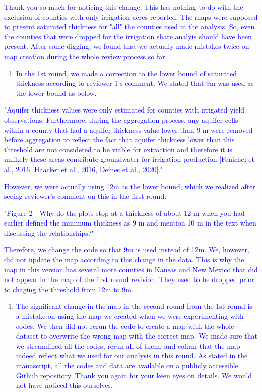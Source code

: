 \documentclass[
]{article}
\providecommand{\tightlist}{%
  \setlength{\itemsep}{0pt}\setlength{\parskip}{0pt}}
\begin{document}
\textcolor{blue}{Thank you so much for noticing this change. This has nothing to do with the exclusion of counties with only irrigation acres reported. The maps were supposed to present saturated thickness for "all" the counties used in the analysis. So, even the counties that were dropped for the irrigation share analyis should have been present. After some digging, we found that we actually made mistakes twice on map creation during the whole review process so far.}

\begin{enumerate}
\def\labelenumi{\arabic{enumi}.}
\tightlist
\item
  \textcolor{blue}{In the 1st round, we made a correction to the lower bound of saturated thickness according to reviewer 1's comment. We stated that 9m was used as the lower bound as below.}
\end{enumerate}

\textcolor{blue}{"Aquifer thickness values were only estimated for counties with irrigated yield observations. Furthermore, during the aggregation process, any aquifer cells within a county that had a aquifer thickness value lower than 9 m were removed before aggregation to reflect the fact that aquifer thickness lower than this threshold are not considered to be viable for extraction and therefore it is unlikely these areas contribute groundwater for irrigation production [Fenichel et al., 2016, Haacker et al., 2016, Deines et al., 2020]."}

\textcolor{blue}{However, we were actually using 12m as the lower bound, which we realized after seeing reviewer's comment on this in the first round:}

\textcolor{blue}{"Figure 2 - Why do the plots stop at a thickness of about 12 m when you had earlier defined the minimum thickness as 9 m and mention 10 m in the text when discussing the relationships?"}

\textcolor{blue}{Therefore, we change the code so that 9m is used instead of 12m. We, however, did not update the map according to this change in the data. This is why the map in this version has several more counties in Kansas and New Mexico that did not appear in the map of the first round revision. They used to be dropped prior to chaging the threshold from 12m to 9m.}

\begin{enumerate}
\def\labelenumi{\arabic{enumi}.}
\setcounter{enumi}{1}
\tightlist
\item
  \textcolor{blue}{The significant change in the map in the second round from the 1st round is a mistake on using the map we created when we were experimenting with codes. We then did not rerun the code to create a map with the whole dataset to overwrite the wrong map with the correct map. We made sure that we streamlined all the codes, rerun all of them, and cofirm that the map indeed reflect what we used for our analysis in this round. As stated in the manuscript, all the codes and data are available on a publicly accessible Github repository. Thank you again for your keen eyes on details. We would not have noticed this ourselves.}
\end{enumerate}
\end{document}
